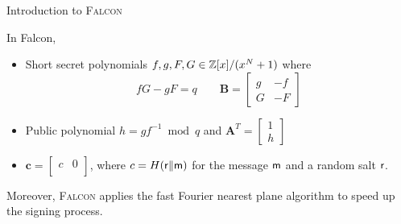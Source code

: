 %

\begin{frame}{Introduction to \textsc{Falcon}}

In Falcon,
\pause
\begin{itemize}
    \item Short secret polynomials $f, g, F, G \in \mathbb{Z}[x] / (x^N+1)$ where
    \[
    fG - gF = q \qquad \mathbf{B} = \left[
\begin{array}{c|c}
g & -f \\ \hline G & -F
\end{array} \right]
    \]
    \pause
    \item Public polynomial $h = gf^{-1} \bmod q$ and $\mathbf{A}^T = \left[
\begin{array}{c} 1 \\ \hline h \end{array} \right]$ 
	\pause
	\item $\mathbf{c} = \left[
\begin{array}{c|c} c & 0 \\ \end{array} \right]$, where $c = H({\sf r} \| {\sf m})$ for the message $\sf m$ and a random salt $\sf r$.
\end{itemize}

\pause
Moreover, \textsc{Falcon} applies the fast Fourier nearest plane algorithm \cite{ducas2016fast} to speed up the signing process.

\end{frame}


%


